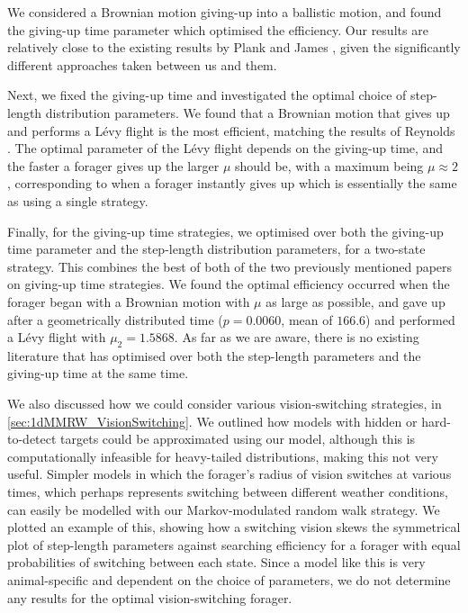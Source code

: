 We considered a Brownian motion giving-up into a ballistic motion, and found the giving-up time parameter which optimised the efficiency. Our results are relatively close to the existing results by Plank and James \cite{Plank_2008}, given the significantly different approaches taken between us and them. 

Next, we fixed the giving-up time and investigated the optimal choice of step-length distribution parameters. We found that a Brownian motion that gives up and performs a L\'{e}vy flight is the most efficient, matching the results of Reynolds \cite{Reynolds_2009_adaptive}. The optimal parameter of the L\'{e}vy flight depends on the giving-up time, and the faster a forager gives up the larger $\mu$ should be, with a maximum being $\mu \approx 2$, corresponding to when a forager instantly gives up which is essentially the same as using a single strategy.

Finally, for the giving-up time strategies, we optimised over both the giving-up time parameter and the step-length distribution parameters, for a two-state strategy. This combines the best of both of the two previously mentioned papers on giving-up time strategies. We found the optimal efficiency occurred when the forager began with a Brownian motion with $\mu$ as large as possible, and gave up after a geometrically distributed time ($p=0.0060$, mean of $166.6$) and performed a L\'{e}vy flight with $\mu_2 = 1.5868$. As far as we are aware, there is no existing literature that has optimised over both the step-length parameters and the giving-up time at the same time.

We also discussed how we could consider various vision-switching strategies, in \cref{sec:1dMMRW_VisionSwitching}. We outlined how models with hidden or hard-to-detect targets could be approximated using our model, although this is computationally infeasible for heavy-tailed distributions, making this not very useful. Simpler models in which the forager's radius of vision switches at various times, which perhaps represents switching between different weather conditions, can easily be modelled with our Markov-modulated random walk strategy. We plotted an example of this, showing how a switching vision skews the symmetrical plot of step-length parameters against searching efficiency for a forager with equal probabilities of switching between each state. Since a model like this is very animal-specific and dependent on the choice of parameters, we do not determine any results for the optimal vision-switching forager.

